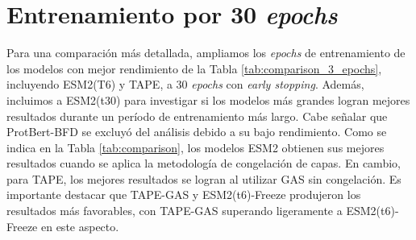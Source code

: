\section{Entrenamiento por 30 \textit{epochs}}

Para una comparación más detallada, ampliamos los \textit{epochs} de entrenamiento de los modelos con mejor rendimiento de la Tabla \ref{tab:comparison_3_epochs}, incluyendo ESM2(T6) y TAPE, a 30 \textit{epochs} con \textit{early stopping}. Además, incluimos a ESM2(t30) para investigar si los modelos más grandes logran mejores resultados durante un período de entrenamiento más largo. Cabe señalar que ProtBert-BFD se excluyó del análisis debido a su bajo rendimiento. Como se indica en la Tabla \ref{tab:comparison}, los modelos ESM2 obtienen sus mejores resultados cuando se aplica la metodología de congelación de capas. En cambio, para TAPE, los mejores resultados se logran al utilizar GAS sin congelación. Es importante destacar que TAPE-GAS y ESM2(t6)-Freeze produjeron los resultados más favorables, con TAPE-GAS superando ligeramente a ESM2(t6)-Freeze en este aspecto.

